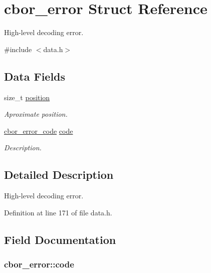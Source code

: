 \hypertarget{structcbor__error}{\section{cbor\-\_\-error Struct Reference}
\label{structcbor__error}
}


High-\/level decoding error.  




{\ttfamily \#include $<$data.\-h$>$}

\subsection*{Data Fields}
\begin{DoxyCompactItemize}
\item 
size\-\_\-t \hyperlink{structcbor__error_a6bc04669e6fff45ad7a5e22ad5826d01}{position}
\begin{DoxyCompactList}\small\item\em Aproximate position. \end{DoxyCompactList}\item 
\hyperlink{data_8h_a13ad43c61d917938e0ce26173e6b2eb6}{cbor\-\_\-error\-\_\-code} \hyperlink{structcbor__error_a8674e7cac94b696eeea37db194026646}{code}
\begin{DoxyCompactList}\small\item\em Description. \end{DoxyCompactList}\end{DoxyCompactItemize}


\subsection{Detailed Description}
High-\/level decoding error. 

Definition at line 171 of file data.\-h.



\subsection{Field Documentation}
\hypertarget{structcbor__error_a8674e7cac94b696eeea37db194026646}{
\subsubsection[{code}]{ cbor\-\_\-error\-::code}}\label{structcbor__error_a8674e7cac94b696eeea37db194026646}


